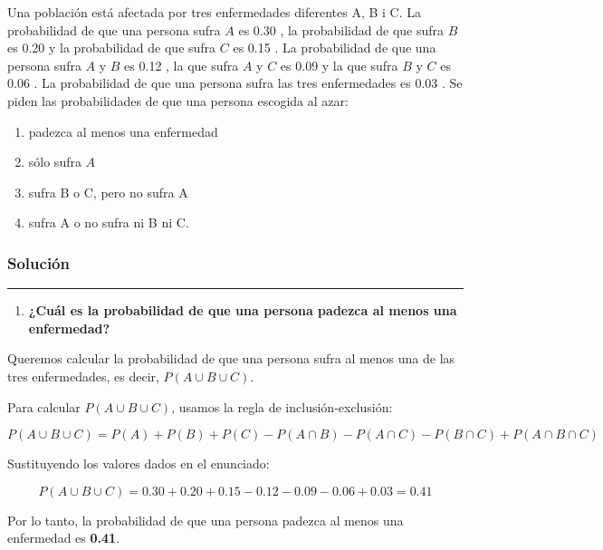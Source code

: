 \documentclass[
]{article}
\providecommand{\tightlist}{%
  \setlength{\itemsep}{0pt}\setlength{\parskip}{0pt}}
\begin{document}
Una población está afectada por tres enfermedades diferentes A, B i C. La probabilidad de que una persona sufra \(A\) es 0.30 , la probabilidad de que sufra \(B\) es 0.20 y la probabilidad de que sufra \(C\) es 0.15 . La probabilidad de que una persona sufra \(A\) y \(B\) es 0.12 , la que sufra \(A\) y \(C\) es 0.09 y la que sufra \(B\) y \(C\) es 0.06 . La probabilidad de que una persona sufra las tres enfermedades es 0.03 . Se piden las probabilidades de que una persona escogida al azar:

\begin{enumerate}

\item padezca al menos una enfermedad

\item sólo sufra $A$

\item sufra B o C, pero no sufra A

\item sufra A o no sufra ni B ni C.

\end{enumerate}

\subsubsection{Solución}\label{soluciuxf3n-1}

\begin{center}\rule{0.5\linewidth}{0.5pt}\end{center}

\begin{enumerate}
\def\labelenumi{\alph{enumi})}
\tightlist
\item
  \textbf{¿Cuál es la probabilidad de que una persona padezca al menos una enfermedad?}
\end{enumerate}

Queremos calcular la probabilidad de que una persona sufra al menos una de las tres enfermedades, es decir, \(P(A \cup B \cup C)\).

Para calcular \(P(A \cup B \cup C)\), usamos la regla de inclusión-exclusión:

\[
P(A \cup B \cup C) = P(A) + P(B) + P(C) - P(A \cap B) - P(A \cap C) - P(B \cap C) + P(A \cap B \cap C)
\]

Sustituyendo los valores dados en el enunciado:

\[
P(A \cup B \cup C) = 0.30 + 0.20 + 0.15 - 0.12 - 0.09 - 0.06 + 0.03 = 0.41
\]

Por lo tanto, la probabilidad de que una persona padezca al menos una enfermedad es \textbf{0.41}.
\end{document}
